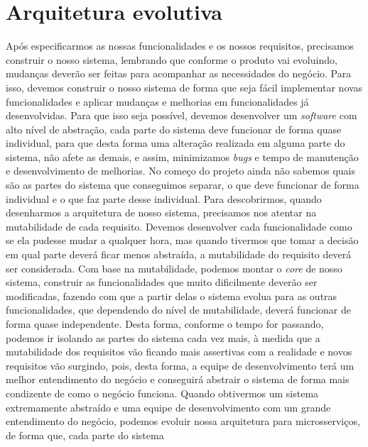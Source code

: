     \section{Arquitetura evolutiva}
      Após especificarmos as nossas funcionalidades e os nossos requisitos, precisamos
      construir o nosso sistema, lembrando que conforme o produto vai evoluindo,
      mudanças deverão ser feitas para acompanhar as necessidades do negócio. Para
      isso, devemos construir o nosso sistema de forma que seja fácil implementar novas
      funcionalidades e aplicar mudanças e melhorias em funcionalidades já desenvolvidas.
      Para que isso seja possível, devemos desenvolver um \textit{software} com alto
      nível de abstração, cada parte do sistema deve funcionar de forma quase
      individual, para que desta forma uma alteração realizada em alguma parte do
      sistema, não afete as demais, e assim, minimizamos \textit{bugs} e tempo de
      manutenção e desenvolvimento de melhorias. \newline
      No começo do projeto ainda não sabemos quais são as partes do sistema que
      conseguimos separar, o que deve funcionar de forma individual e o que faz
      parte desse individual. Para descobrirmos, quando desenharmos a arquitetura
      de nosso sistema, precisamos nos atentar na mutabilidade de cada requisito.
      Devemos desenvolver cada funcionalidade como se ela pudesse mudar a qualquer
      hora, mas quando tivermos que tomar a decisão em qual parte deverá ficar menos
      abstraída, a mutabilidade do requisito deverá ser considerada. Com base na
      mutabilidade, podemos montar o \textit{core} de nosso sistema, construir
      as funcionalidades que muito dificilmente deverão ser modificadas, fazendo
      com que a partir delas o sistema evolua para as outras funcionalidades, que
      dependendo do nível de mutabilidade, deverá funcionar de forma quase independente.
      Desta forma, conforme o tempo for passando, podemos ir isolando as partes
      do sistema cada vez mais, à medida que a mutabilidade dos requisitos vão
      ficando mais assertivas com a realidade e novos requisitos vão surgindo, pois,
      desta forma, a equipe de desenvolvimento terá um melhor entendimento do negócio
      e conseguirá abstrair o sistema de forma mais condizente de como o negócio
      funciona. Quando obtivermos um sistema extremamente abstraído e uma equipe
      de desenvolvimento com um grande entendimento do negócio, podemos evoluir
      nossa arquitetura para microsserviços, de forma que, cada parte do sistema
